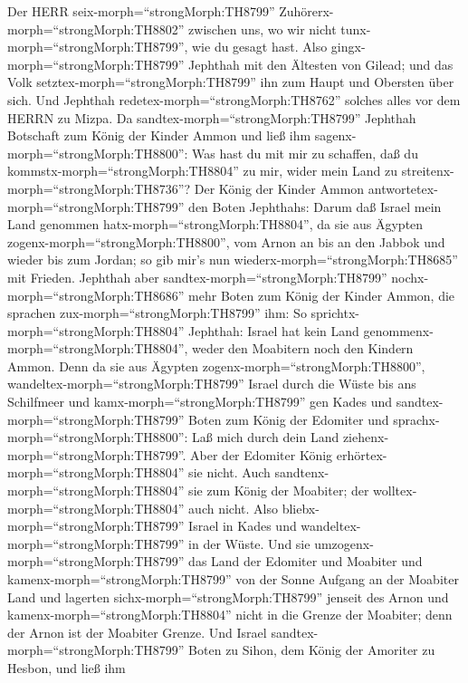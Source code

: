 Der HERR seix-morph=``strongMorph:TH8799''
Zuhörerx-morph=``strongMorph:TH8802'' zwischen uns, wo wir nicht
tunx-morph=``strongMorph:TH8799'', wie du gesagt hast. 
Also gingx-morph=``strongMorph:TH8799'' Jephthah mit den Ältesten von
Gilead; und das Volk setztex-morph=``strongMorph:TH8799'' ihn zum Haupt
und Obersten über sich. Und Jephthah
redetex-morph=``strongMorph:TH8762'' solches alles vor dem HERRN zu
Mizpa.  Da sandtex-morph=``strongMorph:TH8799'' Jephthah
Botschaft zum König der Kinder Ammon und ließ ihm
sagenx-morph=``strongMorph:TH8800'': Was hast du mit mir zu schaffen,
daß du kommstx-morph=``strongMorph:TH8804'' zu mir, wider mein Land zu
streitenx-morph=``strongMorph:TH8736''?  Der König der
Kinder Ammon antwortetex-morph=``strongMorph:TH8799'' den Boten
Jephthahs: Darum daß Israel mein Land genommen
hatx-morph=``strongMorph:TH8804'', da sie aus Ägypten
zogenx-morph=``strongMorph:TH8800'', vom Arnon an bis an den Jabbok und
wieder bis zum Jordan; so gib mir's nun
wiederx-morph=``strongMorph:TH8685'' mit Frieden.  Jephthah
aber sandtex-morph=``strongMorph:TH8799''
nochx-morph=``strongMorph:TH8686'' mehr Boten zum König der Kinder
Ammon,  die sprachen zux-morph=``strongMorph:TH8799'' ihm:
So sprichtx-morph=``strongMorph:TH8804'' Jephthah: Israel hat kein Land
genommenx-morph=``strongMorph:TH8804'', weder den Moabitern noch den
Kindern Ammon.  Denn da sie aus Ägypten
zogenx-morph=``strongMorph:TH8800'',
wandeltex-morph=``strongMorph:TH8799'' Israel durch die Wüste bis ans
Schilfmeer und kamx-morph=``strongMorph:TH8799'' gen Kades 
und sandtex-morph=``strongMorph:TH8799'' Boten zum König der Edomiter
und sprachx-morph=``strongMorph:TH8800'': Laß mich durch dein Land
ziehenx-morph=``strongMorph:TH8799''. Aber der Edomiter König
erhörtex-morph=``strongMorph:TH8804'' sie nicht. Auch
sandtenx-morph=``strongMorph:TH8804'' sie zum König der Moabiter; der
wolltex-morph=``strongMorph:TH8804'' auch nicht. Also
bliebx-morph=``strongMorph:TH8799'' Israel in Kades  und
wandeltex-morph=``strongMorph:TH8799'' in der Wüste. Und sie
umzogenx-morph=``strongMorph:TH8799'' das Land der Edomiter und Moabiter
und kamenx-morph=``strongMorph:TH8799'' von der Sonne Aufgang an der
Moabiter Land und lagerten sichx-morph=``strongMorph:TH8799'' jenseit
des Arnon und kamenx-morph=``strongMorph:TH8804'' nicht in die Grenze
der Moabiter; denn der Arnon ist der Moabiter Grenze.  Und
Israel sandtex-morph=``strongMorph:TH8799'' Boten zu Sihon, dem König
der Amoriter zu Hesbon, und ließ ihm
